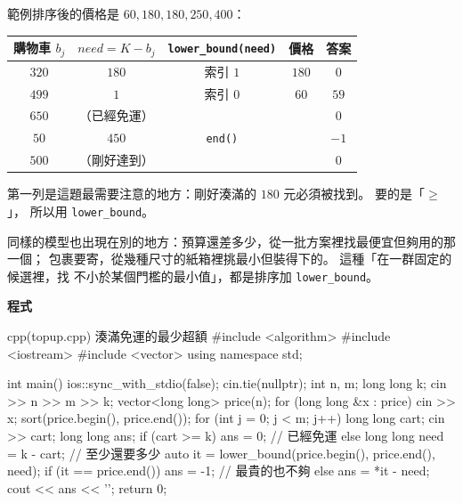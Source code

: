 範例排序後的價格是 $60, 180, 180, 250, 400$：

\begin{center}
\begin{tabular}{ccccc}
\toprule
購物車 $b_j$ & $need = K - b_j$ & \texttt{lower\_bound(need)} & 價格 & 答案 \\
\midrule
$320$ & $180$ & 索引 $1$ & $180$ & $0$ \\
$499$ & $1$ & 索引 $0$ & $60$ & $59$ \\
$650$ & （已經免運） & & & $0$ \\
$50$ & $450$ & \texttt{end()} & & $-1$ \\
$500$ & （剛好達到） & & & $0$ \\
\bottomrule
\end{tabular}
\end{center}

第一列是這題最需要注意的地方：剛好湊滿的 $180$ 元必須被找到。 要的是「$\ge$」，
所以用 \texttt{lower\_bound}。

同樣的模型也出現在別的地方：預算還差多少，從一批方案裡找最便宜但夠用的那一個；
包裹要寄，從幾種尺寸的紙箱裡挑最小但裝得下的。 這種「在一群固定的候選裡，找
不小於某個門檻的最小值」，都是排序加 \texttt{lower\_bound}。

\textbf{程式}

\begin{example}[label=ex:srt-topup]{cpp}{(topup.cpp) 湊滿免運的最少超額}
#include <algorithm>
#include <iostream>
#include <vector>
using namespace std;

int main() {
    ios::sync_with_stdio(false);
    cin.tie(nullptr);
    int n, m;
    long long k;
    cin >> n >> m >> k;
    vector<long long> price(n);
    for (long long &x : price) {
        cin >> x;
    }
    sort(price.begin(), price.end());
    for (int j = 0; j < m; j++) {
        long long cart;
        cin >> cart;
        long long ans;
        if (cart >= k) {
            ans = 0;                                   // 已經免運
        } else {
            long long need = k - cart;                 // 至少還要多少
            auto it = lower_bound(price.begin(), price.end(), need);
            if (it == price.end()) {
                ans = -1;                              // 最貴的也不夠
            } else {
                ans = *it - need;
            }
        }
        cout << ans << '\n';
    }
    return 0;
}
\end{example}


